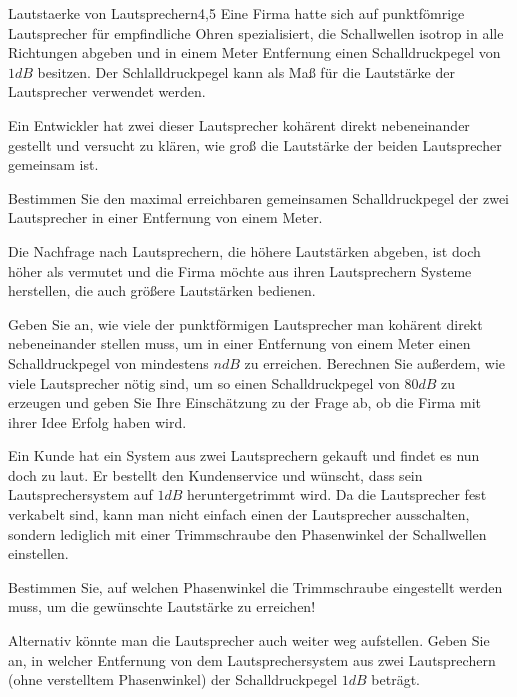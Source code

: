 \begin{problem}{Lautstaerke von Lautsprechern}{4,5}
  Eine Firma hatte sich auf punktfömrige Lautsprecher für empfindliche Ohren spezialisiert, die Schallwellen isotrop in alle Richtungen abgeben und in einem Meter Entfernung einen Schalldruckpegel von $1\unit{dB}$ besitzen. Der Schlalldruckpegel kann als Maß für die Lautstärke der Lautsprecher verwendet werden.
  \begin{abcenum}
    \item Ein Entwickler hat zwei dieser Lautsprecher kohärent direkt nebeneinander gestellt und versucht zu klären, wie groß die Lautstärke der beiden Lautsprecher gemeinsam ist.

Bestimmen Sie den maximal erreichbaren gemeinsamen Schalldruckpegel der zwei Lautsprecher in einer Entfernung von einem Meter.

\item Die Nachfrage nach Lautsprechern, die höhere Lautstärken abgeben, ist doch höher als vermutet und die Firma möchte aus ihren Lautsprechern Systeme herstellen, die auch größere Lautstärken bedienen.

Geben Sie an, wie viele der punktförmigen Lautsprecher man kohärent direkt nebeneinander stellen muss, um in einer Entfernung von einem Meter einen Schalldruckpegel von mindestens $n\unit{dB}$ zu erreichen. Berechnen Sie außerdem, wie viele Lautsprecher nötig sind, um so einen Schalldruckpegel von $80\unit{dB}$ zu erzeugen und geben Sie Ihre Einschätzung zu der Frage ab, ob die Firma mit ihrer Idee Erfolg haben wird.

\item Ein Kunde hat ein System aus zwei Lautsprechern gekauft und findet es nun doch zu laut.  Er bestellt den Kundenservice und wünscht, dass sein Lautsprechersystem auf $1\unit{dB}$ heruntergetrimmt wird.  Da die Lautsprecher fest verkabelt sind, kann man nicht einfach einen der Lautsprecher ausschalten, sondern lediglich mit einer Trimmschraube den Phasenwinkel der Schallwellen einstellen.

Bestimmen Sie, auf welchen Phasenwinkel die Trimmschraube eingestellt werden muss, um die gewünschte Lautstärke zu erreichen!

Alternativ könnte man die Lautsprecher auch weiter weg aufstellen.  Geben Sie an, in welcher Entfernung von dem Lautsprechersystem aus zwei Lautsprechern (ohne verstelltem Phasenwinkel) der Schalldruckpegel $1 \unit{dB}$ beträgt.
  \end{abcenum}


\end{problem}
